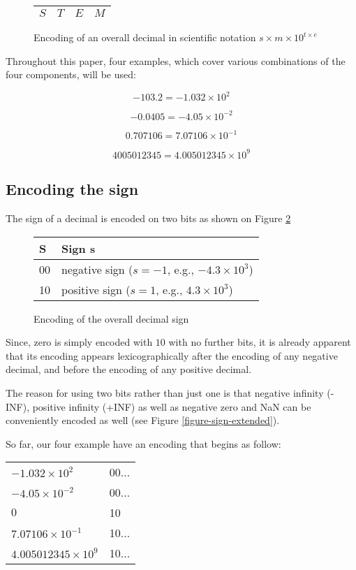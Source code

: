 \documentclass{acm_proc_article-sp}
\begin{document}
\begin{figure}
\caption{Encoding of an overall decimal in scientific notation $s\times m \times10^{t\times e}$}
\label{figure-overall-encoding}
\center
\begin{tabular}{|l|l|l|l|}
\hline
$S$ & $T$ & $E$ & $M$ \\
\hline
\end{tabular}
\end{figure}

Throughout this paper, four examples, which cover various combinations of the four components, will be used:

$$-103.2 = - 1.032 \times 10^2$$

$$-0.0405 = -4.05 \times 10^{-2}$$

$$0.707106 = 7.07106 \times 10^{-1}$$

$$4005012345 = 4.005012345 \times 10^9$$


\subsection{Encoding the sign}

The sign of a decimal is encoded on two bits as shown on Figure \ref{figure-sign}

\begin{figure}
\caption{Encoding of the overall decimal sign}
\label{figure-sign}
\center
\begin{tabular}{|l|l|}
\hline
S & Sign s \\
\hline
00 &  negative sign ($s=-1$, e.g., $-4.3\times10^3$)\\
\hline
10 & positive sign ($s=1$, e.g., $4.3\times10^3$)\\
\hline
\end{tabular}
\end{figure}

Since, zero is simply encoded with $10$ with no further bits, it is already apparent that its encoding appears lexicographically after the encoding of any negative decimal, and before the encoding of any positive decimal.

The reason for using two bits rather than just one is that negative infinity (-INF), positive infinity (+INF) as well as negative zero and NaN can be conveniently encoded as well (see Figure \ref{figure-sign-extended}).

So far, our four example have an encoding that begins as follow:

\begin{tabular}{l|l}
$- 1.032 \times 10^2$ & 00... \\

$-4.05 \times 10^{-2}$ & 00... \\

$0$ & 10 \\

$7.07106 \times 10^{-1}$ & 10... \\

$4.005012345 \times 10^9$ & 10...\\
\end{tabular}
\end{document}
